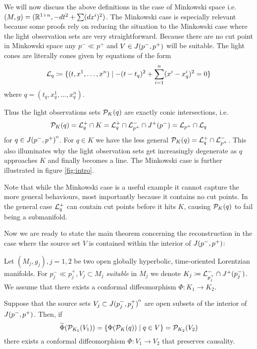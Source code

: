 \begin{example}\label{ex:minkowski}
    We will now discuss the above definitions in the case of Minkowski space i.e. $(M,g)=(\mathbb{R}^{1+n},-dt^2+\sum (dx^i)^2)$. The Minkowski case is especially relevant because some proofs rely on reducing the situation to the Minkowski case where the light observation sets are very straightforward. 
    Because there are no cut point in Minkowski space any $p^-\ll p^+$ and $V\in J(p^-,p^+)$ will be suitable. The light cones are literally cones given by equations of the form 
    \begin{align*}
        {\mathcal{L}}_q\coloneqq \{(t,x^1,\dots,x^n)\mid -(t-t_q)^2 + \sum_{i=1}^n (x^i-x^i_q)^2 = 0\}
    \end{align*}
    where $q=(t_q,x^1_q,\dots,x^n_q)$.

    Thus the light observations sets ${{\mathcal{P}}_K(q)}$ are exactly conic intersections, i.e. 
    \[
        {{\mathcal{P}}_K(q)}={\mathcal{L}}^+_q\cap K = {\mathcal{L}}^+_q\cap {\mathcal{L}}^-_{p^+} \cap J^+(p^-) = {\mathcal{L}}_{p^+} \cap {\mathcal{L}}_q
    \] for $q\in {\kern0ptJ(p^-,p^+)}^{\mathrm{o}}$. For $q\in K$ we have the less general ${{\mathcal{P}}_K(q)} =  {\mathcal{L}}^+_q\cap {\mathcal{L}}^-_{p^+}$.
    This also illuminates why the light observation sets get increasingly degenerate as $q$ approaches $K$ and finally becomes a line. The Minkowski case is further illustrated in figure \ref{fig:intro}.

    Note that while the Minkowski case is a useful example it cannot capture the more general behaviours, most importantly because it contains no cut points. In the general case ${\mathcal{L}}^+_q$ can contain cut points before it hits $K$, causing ${{\mathcal{P}}_K(q)}$ to fail being a submanifold.
\end{example}

Now we are ready to state the main theorem concerning the reconstruction in the case where the source set $V$ is contained within the interior of $J(p^-,p^+)$:
\begin{theorem}\label{thm:intreconstr}
    Let $(M_j,g_j), j=1,2$ be two open globally hyperbolic, time-oriented Lorentzian manifolds. For $p_j^-\ll p_j^+, V_j\subset M_j$ \emph{suitable} in $M_j$ we denote $K_j \coloneqq  {\mathcal{L}}^-_{p_j^+} \cap J^+(p_j^-)$. We assume that there exists a conformal diffeomorphism $\Phi:K_1\to K_2$. 
    
    Suppose that the source sets $V_j\subset{\kern0ptJ(p_j^-,p_j^+)}^{\mathrm{o}}$ are open subsets of the interior of $J(p^-,p^+)$. 
    Then, if 
    \[
    \widetilde{\Phi}({\mathcal{P}}_{K_1}(V_1)) = \{\Phi({\mathcal{P}}_K(q))\mid q \in V\} = {\mathcal{P}}_{K_2}(V_2)
    \]
    there exists a conformal diffeomorphism $\Phi:V_1\to V_2$ that preserves causality.
\end{theorem}

